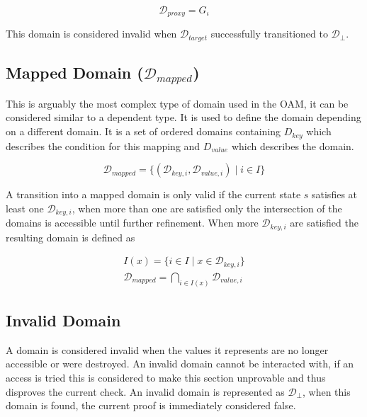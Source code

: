 \documentclass{article}
\begin{document}
    \begin{equation}
        \mathcal{D}_{proxy}=G_\iota
    \end{equation}

    This domain is considered invalid when $\mathcal{D}_{target}$ successfully transitioned to $\mathcal{D}_\bot$.

    \subsection{Mapped Domain ($\mathcal{D}_{mapped}$)}

    This is arguably the most complex type of domain used in the OAM, it can be considered similar to a dependent type. It is used to define the domain depending on a different domain. It is a set of ordered domains containing $D_{key}$ which describes the condition for this mapping and $D_{value}$ which describes the domain.

    \begin{equation}
        \mathcal{D}_{mapped}=\{(\mathcal{D}_{key,i},\mathcal{D}_{value,i})\mid i\in I\}
    \end{equation}

    A transition into a mapped domain is only valid if the current state $s$ satisfies at least one $\mathcal{D}_{key,i}$, when more than one are satisfied only the intersection of the domains is accessible until further refinement. When more $\mathcal{D}_{key,i}$ are satisfied the resulting domain is defined as

    \begin{equation}
        \begin{split}
            I(x)=\{i \in I \mid x \in \mathcal{D}_{key,i} \} \\
            \mathcal{D}_{mapped}=\bigcap_{i \in I(x)}\mathcal{D}_{value,i}
        \end{split}
    \end{equation}

    \subsection{Invalid Domain}

    A domain is considered invalid when the values it represents are no longer accessible or were destroyed. An invalid domain cannot be interacted with, if an access is tried this is considered to make this section unprovable and thus disproves the current check. An invalid domain is represented as $\mathcal{D}_\bot$, when this domain is found, the current proof is immediately considered false.
\end{document}
